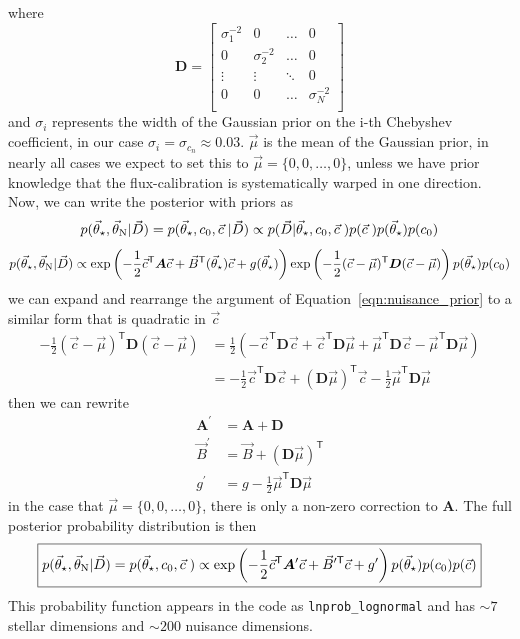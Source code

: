 \documentclass[preprint]{aastex} %
\newcommand{\vt}{\vec{\theta}}
\newcommand{\vstar}{\vt_{\star}}
\newcommand{\vN}{\vt_{\rm N}}
\newcommand{\vc}{\vec{c}}
\newcommand{\vD}{\vec{D}}
\newcommand{\trans}{\mathsf{T}}
\begin{document}
where 
\begin{equation}
  {\bm D} = 
  \begin{bmatrix}
    \sigma_1^{-2} & 0 & \hdots & 0 \\
    0 & \sigma_2^{-2} & \hdots & 0 \\
    \vdots & \vdots & \ddots & 0 \\
    0 & 0 & \hdots & \sigma_N^{-2} \\
  \end{bmatrix}
\end{equation}
and $\sigma_i$ represents the width of the Gaussian prior on the i-th Chebyshev coefficient, in our case $\sigma_i = \sigma_{c_n} \approx 0.03$. $\vec{\mu}$ is the mean of the Gaussian prior, in nearly all cases we expect to set this to $\vec{\mu} = \{0, 0, \ldots, 0\}$, unless we have prior knowledge that the flux-calibration is systematically warped in one direction. Now, we can write the posterior with priors as
\begin{equation}
  p(\vstar, \vN | \vD) = p(\vstar, c_0, \vc\; | \vD) \propto p( \vD | \vstar, c_0, \vc\; ) p(\vc\;) p(\vstar) p(c_0) 
\end{equation}
\begin{equation}
  p(\vstar, \vN | \vD) \propto \exp \left ( - \frac{1}{2} \vc^\trans {\bm A} \vc + \vec{B}^\trans(\vstar) \vc + g(\vstar) \right )  \exp \left ( -\frac{1}{2} (\vc - \vec{\mu})^\trans {\bm D} (\vc - \vec{\mu}) \right ) p(\vstar) p(c_0)
  \label{eqn:posterior_prior}
\end{equation}
we can expand and rearrange the argument of Equation~\ref{eqn:nuisance_prior} to a similar form that is quadratic in $\vc$
\begin{align}
  -\frac{1}{2} (\vc - \vec{\mu})^\trans {\bm D} (\vc - \vec{\mu}) &= \frac{1}{2}\left ( -\vc^\trans {\bm D} \vc + \vc^\trans {\bm D} \vec{\mu} + \vec{\mu}^\trans {\bm D} \vc - \vec{\mu}^\trans {\bm D} \vec{\mu} \right )\\
  &= -\frac{1}{2} \vc^\trans {\bm D} \vc + ({\bm D} \vec{\mu})^\trans \vc - \frac{1}{2} \vec{\mu}^\trans {\bm D} \vec{\mu}
\end{align}
then we can rewrite
\begin{align}
  {\bm A}^\prime &= {\bm A} + {\bm D}\\
  \vec{B}^\prime &= \vec{B} + ({\bm D} \vec{\mu})^\trans\\
  g^\prime &= g - \frac{1}{2} \vec{\mu}^\trans {\bm D} \vec{\mu} 
\end{align}
in the case that $\vec{\mu} = \{0, 0, \ldots, 0\}$, there is only a non-zero correction to ${\bm A}$. The full posterior probability distribution is then
 \begin{equation}
   \boxed{
  p(\vstar, \vN | \vD) = p(\vstar, c_0, \vc\;) \propto \exp \left ( - \frac{1}{2} \vc^\trans {\bm A}^\prime \vc + \vec{B}^{\prime \trans} \vc + g^\prime \right ) p(\vstar) p(c_0) p(\vc)
}
\end{equation}
This probability function appears in the code as \texttt{lnprob\_lognormal} and has $\sim 7$ stellar dimensions and $\sim 200$ nuisance dimensions.
\end{document}
